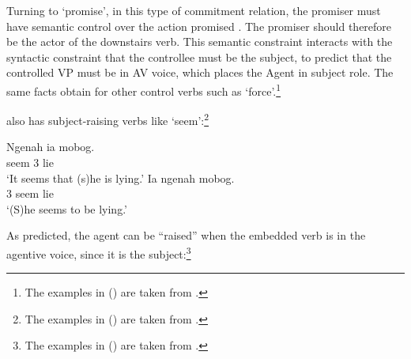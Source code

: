 \documentclass[output=paper
	        ,collection
	        ,collectionchapter
 	        ,biblatex
                ,babelshorthands
                ,newtxmath
                ,draftmode
                ,colorlinks, citecolor=brown
]{langscibook}
\begin{document}
Turning to  `promise', in this type of commitment relation, the promiser must have semantic control over the action promised \citep{Farkas1988,Kroeger1993,SagandPollard1991}. The promiser should therefore be the actor of the downstairs verb. This semantic constraint interacts with the syntactic constraint that the controllee must be the subject, to predict that the controlled VP must be in AV voice, which places the Agent in subject role. The same facts obtain for other control verbs such as  `force'.\footnote{
The examples in () are taken from .
}

\eal
{}
\zl

 also has subject-raising verbs like  `seem':\footnote{
The examples in () are taken from .
}

\eal
\ex 
\gll Ngenah ia mobog.\\
     seem 3 lie\\
\glt `It seems that (s)he is lying.'
\ex 
\gll  Ia ngenah mobog.\\
      3 seem lie\\
\glt `(S)he seems to be lying.'
\zl

As predicted, the agent can be ``raised'' when the embedded verb is in the agentive voice, since it is the subject:\footnote{
The examples in () are taken from .
}

\eal
{}
\zl
\end{document}
